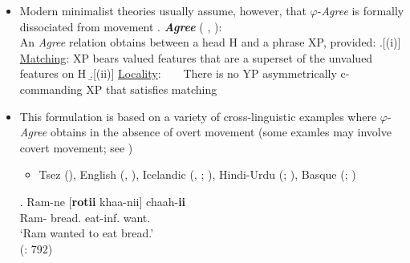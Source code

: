 \documentclass[letterpaper,10pt]{handout_nick}
\begin{document}
\begin{itemize}
\item Modern minimalist theories usually assume, however, that $\varphi$-\emph{Agree} is formally dissociated from movement
\ex. {\bf \emph{Agree}} (\citeauthor{chomsky00} \citeyear{chomsky00}, \citeyear{chomsky01}):\\
An \emph{Agree} relation obtains between a head H and a phrase XP, provided:
\a.[(i)] \ul{Matching}: XP bears valued features that are a superset of the unvalued features on H 
\b.[(ii)] \ul{Locality}:\ \ \ \ There is no YP asymmetrically c-commanding XP that satisfies matching

\item This formulation is based on a variety of cross-linguistic examples where $\varphi$-\emph{Agree} obtains in the absence of overt movement (some examles may involve covert movement; see \citealt{koopman06})
\begin{itemize}
\item Tsez (\citealt{polinsky01}), English (\citealt{chomsky00}, \citeyear{chomsky01}), Icelandic (\citealt{sigurdhsson96}, \citeyear{sigurdhsson08}; \citealt{boeckx08b}), Hindi-Urdu (\citealt{boeckx04}; \citealt{bhatt05}), Basque (\citealt{etxepare07}; \citealt{preminger09})
\end{itemize}
\exg. Ram-ne [{\bf rotii} khaa-nii] chaah-{\bf ii}\\
Ram- bread. eat-inf. want.\\
`Ram wanted to eat bread.'\\
(\citealt{bhatt05}: 792)


\end{itemize}
\end{document}
